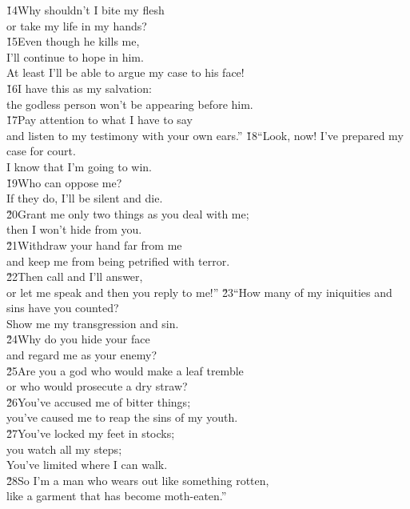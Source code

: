 \begin{poetry}
\poeml \v{14}Why shouldn't I bite my flesh \\
\poemll    or take my life in my hands? \\
\poeml \v{15}Even though he kills me, \\
\poemll    I'll continue to hope in him. \\
\poemlll       At least I'll be able to argue my case to his face! \\
\poeml \v{16}I have this as my salvation: \\
\poemll    the godless person won't be appearing before him. \\
\poeml \v{17}Pay attention to what I have to say \\
\poemll    and listen to my testimony with your own ears.''
\poeml \v{18}``Look, now! I've prepared my case for court. \\
\poemll    I know that I'm going to win. \\
\poeml \v{19}Who can oppose me? \\
\poemll    If they do, I'll be silent and die. \\
\poeml \v{20}Grant me only two things as you deal with me; \\
\poemll    then I won't hide from you. \\
\poeml \v{21}Withdraw your hand far from me \\
\poemll    and keep me from being petrified with terror. \\
\poeml \v{22}Then call and I'll answer, \\
\poemll    or let me speak and then you reply to me!''
\poeml \v{23}``How many of my iniquities and sins have you counted? \\
\poemll    Show me my transgression and sin. \\
\poeml \v{24}Why do you hide your face \\
\poemll    and regard me as your enemy? \\
\poeml \v{25}Are you a god who would make a leaf tremble \\
\poemll    or who would prosecute a dry straw? \\
\poeml \v{26}You've accused me of bitter things; \\
\poemll    you've caused me to reap the sins of my youth. \\
\poeml \v{27}You've locked my feet in stocks; \\
\poemll    you watch all my steps; \\
\poemlll       You've limited where I can walk. \\
\poeml \v{28}So I'm a man who wears out like something rotten, \\
\poemll    like a garment that has become moth-eaten.''
\end{poetry}

